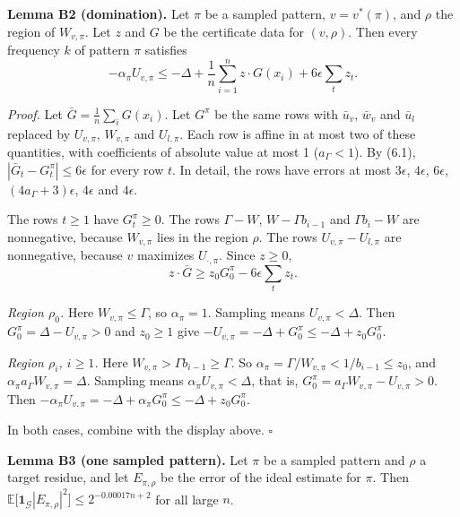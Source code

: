 \documentclass[10pt,a4paper]{article}
\begin{document}
\textbf{Lemma B2 (domination).} Let $\pi$ be a sampled pattern, $v = v^*(\pi)$, and $\rho$ the region of $W_{v,\pi}$. Let $z$ and
$G$ be the certificate data for $(v, \rho)$. Then every frequency $k$ of pattern $\pi$ satisfies
\[-\alpha_\pi U_{v,\pi} \le -\Delta + \frac1n\sum_{i=1}^nz\cdot G(x_i) + 6\epsilon\sum_tz_t.\]

\emph{Proof.} Let $\bar G = \frac1n\sum_iG(x_i)$. Let $G^\pi$ be the same rows with $\bar u_v$, $\bar w_v$ and $\bar u_l$ replaced
by $U_{v,\pi}$, $W_{v,\pi}$ and $U_{l,\pi}$. Each row is affine in at most two of these quantities, with coefficients of
absolute value at most 1 ($a_\Gamma < 1$). By (6.1), $|\bar G_t - G^\pi_t| \le 6\epsilon$ for every row $t$. In detail,
the rows have errors at most $3\epsilon$, $4\epsilon$, $6\epsilon$, $(4a_\Gamma + 3)\epsilon$, $4\epsilon$ and $4\epsilon$.

The rows $t \ge 1$ have $G^\pi_t \ge 0$. The rows $\Gamma - W$, $W - \Gamma b_{i-1}$ and $\Gamma b_i - W$ are nonnegative,
because $W_{v,\pi}$ lies in the region $\rho$. The rows $U_{v,\pi} - U_{l,\pi}$ are nonnegative, because $v$ maximizes
$U_{\cdot,\pi}$. Since $z \ge 0$,
\[z\cdot\bar G \ge z_0G^\pi_0 - 6\epsilon\textstyle\sum_tz_t.\]

\emph{Region $\rho_0$.} Here $W_{v,\pi} \le \Gamma$, so $\alpha_\pi = 1$. Sampling means $U_{v,\pi} < \Delta$. Then
$G^\pi_0 = \Delta - U_{v,\pi} > 0$ and $z_0 \ge 1$ give $-U_{v,\pi} = -\Delta + G^\pi_0 \le -\Delta + z_0G^\pi_0$.

\emph{Region $\rho_i$, $i \ge 1$.} Here $W_{v,\pi} > \Gamma b_{i-1} \ge \Gamma$. So $\alpha_\pi = \Gamma/W_{v,\pi} < 1/b_{i-1} \le z_0$,
and $\alpha_\pi a_\Gamma W_{v,\pi} = \Delta$. Sampling means $\alpha_\pi U_{v,\pi} < \Delta$, that is,
$G^\pi_0 = a_\Gamma W_{v,\pi} - U_{v,\pi} > 0$. Then $-\alpha_\pi U_{v,\pi} = -\Delta + \alpha_\pi G^\pi_0 \le -\Delta + z_0G^\pi_0$.

In both cases, combine with the display above. $\square$

\textbf{Lemma B3 (one sampled pattern).} Let $\pi$ be a sampled pattern and $\rho$ a target residue, and let $E_{\pi,\rho}$ be the
error of the ideal estimate for $\pi$. Then $\mathbb E\big[\mathbf 1_{\mathcal G}|E_{\pi,\rho}|^2\big] \le 2^{-0.00017n + 2}$
for all large $n$.
\end{document}
